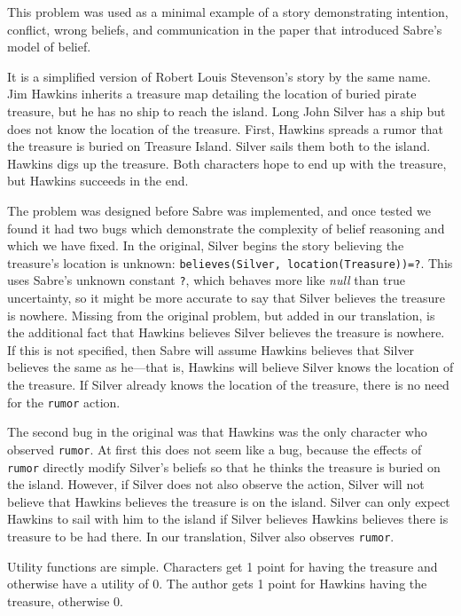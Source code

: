 \documentclass{nilreport}
\makeatletter
\renewcommand{\bibentry}[1]{\nocite{#1}{\frenchspacing\@nameuse{BR@r@#1\@extra@b@citeb}}}
\makeatother
\begin{document}
This problem was used as a minimal example of a story demonstrating
intention, conflict, wrong beliefs, and communication in the paper
that introduced Sabre's model of belief.

\begin{quote}
	\bibentry{shirvani2017possible}
\end{quote}

\noindent It is a simplified version of Robert Louis Stevenson's story
by the same name. Jim Hawkins inherits a treasure map detailing the
location of buried pirate treasure, but he has no ship to reach the
island. Long John Silver has a ship but does not know the location
of the treasure. First, Hawkins spreads a rumor that the treasure
is buried on Treasure Island. Silver sails them both to the island.
Hawkins digs up the treasure. Both characters hope to end up with
the treasure, but Hawkins succeeds in the end.

The problem was designed before Sabre was implemented, and once tested
we found it had two bugs which demonstrate the complexity of belief
reasoning and which we have fixed. In the original, Silver begins
the story believing the treasure's location is unknown: \texttt{believes(Silver,
location(Treasure))=?}. This uses Sabre's unknown constant \texttt{?},
which behaves more like \emph{null} than true uncertainty, so it might
be more accurate to say that Silver believes the treasure is nowhere.
Missing from the original problem, but added in our translation, is
the additional fact that Hawkins believes Silver believes the treasure
is nowhere. If this is not specified, then Sabre will assume Hawkins
believes that Silver believes the same as he---that is, Hawkins will
believe Silver knows the location of the treasure. If Silver already
knows the location of the treasure, there is no need for the \texttt{rumor}
action.

The second bug in the original was that Hawkins was the only character
who observed \texttt{rumor}. At first this does not seem like a bug,
because the effects of \texttt{rumor} directly modify Silver's beliefs
so that he thinks the treasure is buried on the island. However, if
Silver does not also observe the action, Silver will not believe that
Hawkins believes the treasure is on the island. Silver can only expect
Hawkins to sail with him to the island if Silver believes Hawkins
believes there is treasure to be had there. In our translation, Silver
also observes \texttt{rumor}.

Utility functions are simple. Characters get 1 point for having the
treasure and otherwise have a utility of 0. The author gets 1 point
for Hawkins having the treasure, otherwise 0.
\end{document}
